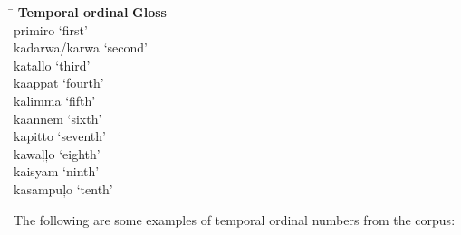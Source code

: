 \ea
\label{ex:temporalordinals}
\begin{tabbing}
\hspace{3.1cm} \= \kill
\textbf{Temporal ordinal} \> \textbf{Gloss} \\
primiro \> ‘first’ \\
kadarwa/karwa \> ‘second’ \\
katallo \> ‘third’ \\
kaappat \> ‘fourth’ \\
kalimma \> ‘fifth’ \\
kaannem \> ‘sixth’ \\
kapitto \> ‘seventh’ \\
kawaļļo \> ‘eighth’ \\
kaisyam \> ‘ninth’ \\
kasampuļo \> ‘tenth’
\end{tabbing}\z

The following are some examples of temporal ordinal numbers from the corpus:

